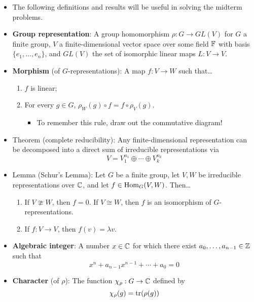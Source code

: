 \documentclass[../notes.tex]{subfiles}
\begin{document}
\begin{itemize}
    \item {}The following definitions and results will be useful in solving the midterm problems.
    \item \textbf{Group representation}: A group homomorphism $\rho:G\to GL(V)$ for $G$ a finite group, $V$ a finite-dimensional vector space over some field $\mathbb{F}$ with basis $\{e_1,\dots,e_n\}$, and $GL(V)$ the set of isomorphic linear maps $L:V\to V$.
    \item \textbf{Morphism} (of $G$-representations): A map $f:V\to W$ such that\dots
    \begin{enumerate}
        \item $f$ is linear;
        \item For every $g\in G$, $\rho_W(g)\circ f=f\circ\rho_V(g)$.
        \begin{itemize}
            \item To remember this rule, draw out the commutative diagram!
        \end{itemize}
    \end{enumerate}
    \item Theorem (complete reducibility): Any finite-dimensional representation can be decomposed into a direct sum of irreducible representations via
    \begin{equation*}
        V = V_1^{n_1}\oplus\cdots\oplus V_k^{n_k}
    \end{equation*}
    \item Lemma (Schur's Lemma): Let $G$ be a finite group, let $V,W$ be irreducible representations over $\mathbb{C}$, and let $f\in\operatorname{Hom}_G(V,W)$. Then\dots
    \begin{enumerate}
        \item If $V\ncong W$, then $f=0$. If $V\cong W$, then $f$ is an isomorphism of $G$-representations.
        \item If $f:V\to V$, then $f(v)=\lambda v$.
    \end{enumerate}
    \item \textbf{Algebraic integer}: A number $x\in\mathbb{C}$ for which there exist $a_0,\dots,a_{n-1}\in\mathbb{Z}$ such that
    \begin{equation*}
        x^n+a_{n-1}x^{n-1}+\cdots+a_0 = 0
    \end{equation*}
    \item \textbf{Character} (of $\rho$): The function $\chi_\rho:G\to\mathbb{C}$ defined by
    \begin{equation*}
        \chi_\rho(g) = \tr(\rho(g))

\end{equation*}
\end{itemize}
\end{document}
